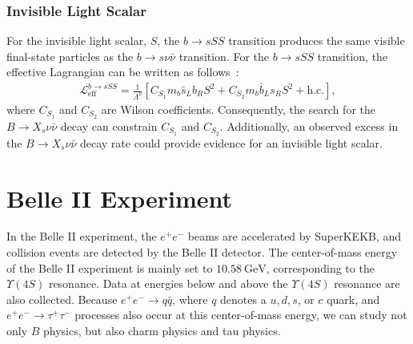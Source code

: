 \subsection{Invisible Light Scalar}
\label{sec:invisible_scalar}
For the invisible light scalar, $S$, the $b\rightarrow s SS$ transition produces the same visible final-state particles as the $b \rightarrow s \nu \bar{\nu}$ transition.
For the $b\rightarrow s SS$ transition, the effective Lagrangian can be written as follows~\cite{Calcuttawala:2017usw}:
\begin{align}
  \label{eq:lagrangian_light_scalar}
  \mathcal{L}_{\textrm{eff}}^{b\rightarrow s S S} = \frac{1}{\Lambda^{2}}\left[C_{S_{1}}m_{b}\bar{s}_{L}b_{R}S^{2}+C_{S_{2}}m_{b}\bar{b}_{L}s_{R}S^{2} + \textrm{h.c.} \right],
\end{align}
where $C_{S_{1}}$ and $C_{S_{2}}$ are Wilson coefficients.
Consequently, the search for the $B\rightarrow X_{s} \nu \bar{\nu}$ decay can constrain $C_{S_{1}}$ and $C_{S_{2}}$.
Additionally, an observed excess in the $B\rightarrow X_{s} \nu \bar{\nu}$ decay rate could provide evidence for an invisible light scalar. 

\chapter{Belle II Experiment}
In the Belle II experiment, the $e^{+}e^{-}$ beams are accelerated by SuperKEKB, and collision events are detected by the Belle II detector.
The center-of-mass energy of the Belle II experiment is mainly set to $10.58~\textrm{GeV}$, corresponding to the $\Upsilon(4S)$ resonance.
Data at energies below and above the $\Upsilon(4S)$ resonance are also collected.
Because $e^{+}e^{-}\rightarrow q\bar{q}$, where $q$ denotes a $u,d,s$, or $c$ quark, and $e^{+}e^{-}\rightarrow \tau^{+}\tau^{-}$ processes also occur at this center-of-mass energy, we can study not only $B$ physics, but also charm physics and tau physics.

